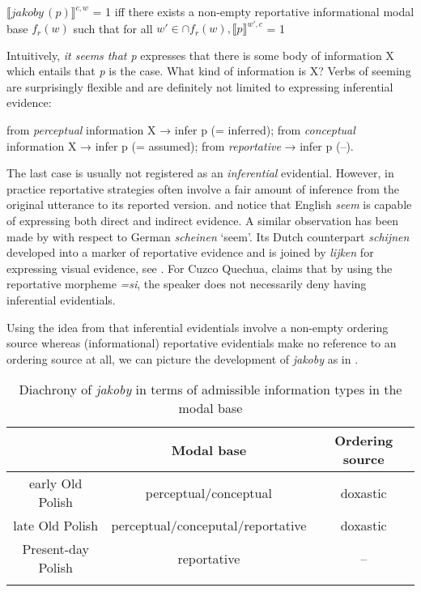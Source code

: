 \documentclass[output=paper]{langsci/langscibook}
\begin{document}
\ea	\(⟦\textit{jakoby}\,(p)⟧^{c,w}\) = 1 iff there exists a non-empty reportative informational modal base \( f_{r}(w) \) such that for all \( w' \in \cap f_{r}(w), ⟦p⟧^{w',c}\) = 1 \label{reportative}\z

\noindent Intuitively, \emph{it seems that p} expresses that there is some body of information X which entails that \emph{p} is the case. What kind of information is X? Verbs of seeming are surprisingly flexible and are definitely not limited to expressing inferential evidence:

\ea \ea from \emph{perceptual} information X → infer p (= inferred);
	\ex	 from \emph{conceptual} information X → infer p (= assumed);
	\ex	 from \emph{reportative} → infer p (--).
\z
\z

\noindent The last case is usually not registered as an \emph{inferential} evidential. However, in practice reportative strategies often involve a fair amount of inference from the original utterance to its reported version. \Textcite{Haan2007} and \textcite{Grimm2010} notice that English \emph{seem} is capable of expressing both direct and indirect evidence. A similar observation has been made by \textcite{Reis2007} with respect to German \emph{scheinen} `seem'. Its Dutch counterpart \emph{schijnen} developed into a marker of reportative evidence and is joined by \emph{lijken} for expressing visual evidence, see \textcite{Koring2013}. For Cuzco Quechua, \textcite[53--55]{Faller2001} claims that by using the reportative morpheme \emph{=si}, the speaker does not necessarily deny having inferential evidentials.

Using the idea from \textcite{Faller2011} that inferential evidentials involve a non-empty ordering source whereas (informational) reportative evidentials make no reference to an ordering source at all, we can picture the development of \emph{jakoby} as in .

\begin{table}[h]
\begin{tabular}{ccc}
\lsptoprule
{} & Modal base & Ordering source \\
\midrule
early Old Polish & perceptual\slash conceptual & doxastic \\
late Old Polish & perceptual\slash conceputal\slash reportative & doxastic \\
Present-day Polish & reportative & -- \\
\lspbottomrule
\end{tabular}
\caption{Diachrony of \emph{jakoby} in terms of admissible information types in the modal base\label{tab:jakoby:13}}
\end{table}
\end{document}
